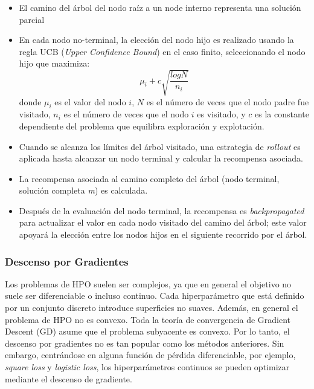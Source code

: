 \begin{itemize}
	\item El camino del árbol del nodo raíz a un node interno representa una solución parcial
	\item  En cada nodo no-terminal, la elección del nodo hijo es realizado usando la regla UCB (\textit{Upper Confidence Bound}) en el caso finito, seleccionando el nodo hijo que maximiza: 
	$$
	 \mu_i + c\sqrt{\frac{logN}{n_i}}
	$$
	donde $\mu_i$  es el valor del nodo $i$, $N$ es el número de veces que el nodo padre fue visitado, $n_i$ es el número de veces que el nodo $i$ es visitado, y $c$ es la constante dependiente del problema que equilibra exploración y explotación.
	\item Cuando se alcanza los límites del árbol visitado, una estrategia de \textit{rollout} es aplicada hasta alcanzar un nodo terminal y calcular la recompensa asociada.
	\item La recompensa asociada al camino completo del árbol (nodo terminal, solución completa \textit{m}) es calculada.
	\item Después de la evaluación del nodo terminal, la recompensa es \textit{backpropagated} para actualizar el valor en cada nodo visitado del camino del árbol; este valor apoyará la elección entre los nodos hijos en el siguiente recorrido por el árbol.
\end{itemize}

\subsubsection{Descenso por Gradientes}


Los problemas de HPO suelen ser complejos, ya que en general el objetivo no suele ser diferenciable o incluso continuo. Cada hiperparámetro que está definido por un conjunto discreto introduce superficies no suaves. Además, en general el problema de HPO no es convexo. Toda la teoría de convergencia de Gradient Descent  (GD) asume que el problema subyacente es convexo. Por lo tanto, el descenso por gradientes no es tan popular como los métodos anteriores. Sin embargo, centrándose en alguna función de pérdida diferenciable, por ejemplo, \textit{square loss} y \textit{logistic loss}, los hiperparámetros continuos se pueden optimizar mediante el descenso de gradiente.

